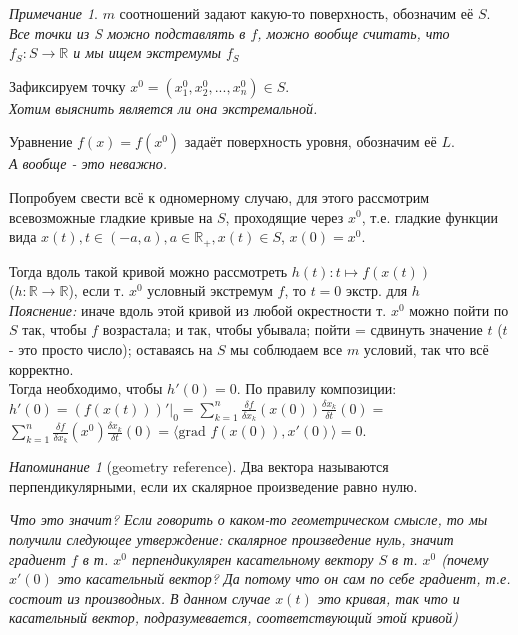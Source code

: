 \documentclass{article}
\theoremstyle{indented}
\theoremstyle{definition}
\theoremstyle{remark}
\newtheorem*{remark}{Примечание}
\newtheorem*{remind}{Напоминание}
\newcommand{\df}[2]{\frac{\delta #1}{\delta #2}}
\begin{document}
\begin{remark}
    $m$ соотношений задают какую-то поверхность, обозначим её $S$.
    \textit{Все точки из S можно подставлять в $f$, можно вообще 
    считать, что $f_S: S \to \mathbb{R}$ и мы ищем экстремумы $f_S$}

    Зафиксируем точку $x^0 = (x^0_1, x^0_2, ... , x^0_n) \in S$. \\
    \textit{Хотим выяснить является ли она экстремальной.}

    Уравнение $f(x)=f(x^0)$ задаёт поверхность уровня, 
    обозначим её $L$. \\
    \textit{А вообще - это неважно.}

    Попробуем свести всё к одномерному случаю, для
    этого рассмотрим всевозможные гладкие кривые на $S$, проходящие через $x^0$, 
    т.е. гладкие функции вида 
    $x(t), t\in (-a, a), a \in \mathbb{R}_+, x(t) \in S$,
    $x(0)=x^0$. 
    
    Тогда вдоль такой кривой можно рассмотреть $h(t): t \mapsto f(x(t))$\\
    ($h: \mathbb{R} \to \mathbb{R}$), если т. $x^0$ условный экстремум $f$, 
    то $t=0$ экстр. для $h$ \\
    \textit{Пояснение:} иначе вдоль этой кривой из любой 
    окрестности т. $x^0$ можно пойти по $S$ так, чтобы $f$ возрастала; и так, чтобы
    убывала; пойти = сдвинуть значение $t$ ($t$ - это просто число); оставаясь
    на $S$ мы соблюдаем все $m$ условий, так что всё корректно.\\
    Тогда необходимо, чтобы $h'(0)=0$. По правилу композиции: 
    $h'(0)=(f(x(t)))'\big|_{0}=\sum\limits_{k=1}^{n} \df{f}{x_k}(x(0)) \df{x_k}{t}(0)=$
    $\sum\limits_{k=1}^{n} \df{f}{x_k}(x^0) \df{x_k}{t}(0)=\langle \textrm{grad } f(x(0)), x'(0) \rangle = 0$.
    
    \begin{remind}[geometry reference]
        Два вектора называются перпендикулярными, если их 
        скалярное произведение равно нулю. 
    \end{remind}

    \textit{Что это значит? Если говорить о каком-то геометрическом смысле, 
    то мы получили следующее утверждение: скалярное произведение нуль, значит
    градиент $f$ в т. $x^0$ перпендикулярен касательному вектору $S$ в т. $x^0$ 
    (почему $x'(0)$ это касательный вектор? Да потому что он сам по себе градиент,
    т.е. состоит из производных. В данном случае $x(t)$ это кривая, так что
    и касательный вектор, подразумевается, соответствующий этой кривой)}
    

\end{remark}
\end{document}
